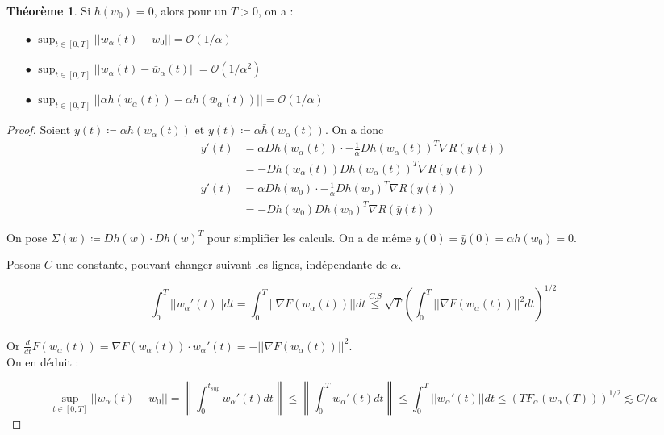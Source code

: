 \documentclass[a4paper, 11pt, french]{article}
\theoremstyle{definition}
\newtheorem{theorem}{Théorème}
\newcommand{\norm}[1]{\left\lVert#1\right\rVert}
\begin{document}
	\begin{theorem}
		Si $h(w_0) = 0$, alors pour un $T > 0$, on a :
		\begin{itemize}
			\item[$\bullet$] $\sup_{t \in [0, T]} ||w_{\alpha}(t) - w_0|| = \mathcal{O}(1 / \alpha)$
			\item[$\bullet$] $\sup_{t \in [0, T]} ||w_{\alpha}(t) - \bar{w}_{\alpha}(t)|| = \mathcal{O}(1 / \alpha^2)$
			\item[$\bullet$] $\sup_{t \in [0, T]} ||\alpha h(w_{\alpha}(t)) - \alpha \bar{h}(\bar{w}_{\alpha}(t))|| = \mathcal{O}(1 / \alpha)$
		\end{itemize}
	\end{theorem}
	\begin{proof}
		 Soient $y(t) \coloneqq \alpha h(w_{\alpha}(t))$ et $\bar{y}(t) \coloneqq \alpha \bar{h}(\bar{w}_{\alpha}(t))$. On a donc 
		 \begin{align*}
		 	y'(t) &= \alpha Dh(w_{\alpha}(t)) \cdot - \frac{1}{\alpha} Dh (w_{\alpha}(t))^T \nabla R (y(t)) \\
		 	&= - Dh(w_{\alpha}(t)) Dh (w_{\alpha}(t))^T \nabla R(y(t)) \\
	 		\bar{y}'(t) &= \alpha Dh(w_0) \cdot - \frac{1}{\alpha} Dh (w_0)^T \nabla R(\bar{y}(t)) \\
	 		&= - Dh(w_0)Dh (w_0)^T \nabla R (\bar{y}(t))
		 \end{align*}
	 
		On pose $\Sigma (w) \coloneqq Dh(w) \cdot Dh (w)^T$ pour simplifier les calculs. On a de même $y(0) = \bar{y}(0) = \alpha h(w_0) = 0$.
		
		Posons $C$ une constante, pouvant changer suivant les lignes, indépendante de $\alpha$.
		
		\[\int_0^T ||w_{\alpha}'(t)|| dt = \int_0^T ||\nabla F(w_{\alpha}(t))|| dt \stackrel{C.S}{\leq} \sqrt{T} \left( \int_0^T ||\nabla F(w_{\alpha}(t))||^2 dt \right)^{1/2} \] \\
	 	
	 	Or $\frac{d}{dt} F(w_{\alpha}(t)) = \nabla F(w_{\alpha}(t)) \cdot w_{\alpha}'(t) = -||\nabla F(w_{\alpha}(t))||^2$. \\
	 	
	 	On en déduit :
	 	
	 	\[\sup_{t \in [0, T]} ||w_{\alpha}(t) - w_0|| = \norm{\int_0^{t_{sup}} w_{\alpha}'(t) dt}  \leq \norm{\int_0^T w_{\alpha}'(t) dt} \leq \int_0^T ||w_{\alpha}'(t)|| dt \leq (T F_{\alpha}(w_{\alpha}(T)))^{1/2} \lesssim C / \alpha\]
	 	

\end{proof}
\end{document}
